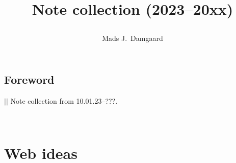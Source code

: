 \documentclass{report}
\title{
	Note collection (2023--20xx)
	\author{Mads J.\ Damgaard%
	}
}
\begin{document}
\maketitle

\section*{Foreword}
{\centering\noindent
	\vspace{-\baselineskip}
	\hspace{-0.7em}
	{\hspace{-4.em}$|$\hspace{\linewidth}\hspace{8em}$|$}
}
Note collection from 10.01.23--???. 

%

\ 

\lipsum[1]


\chapter{Web ideas}

\end{document}

